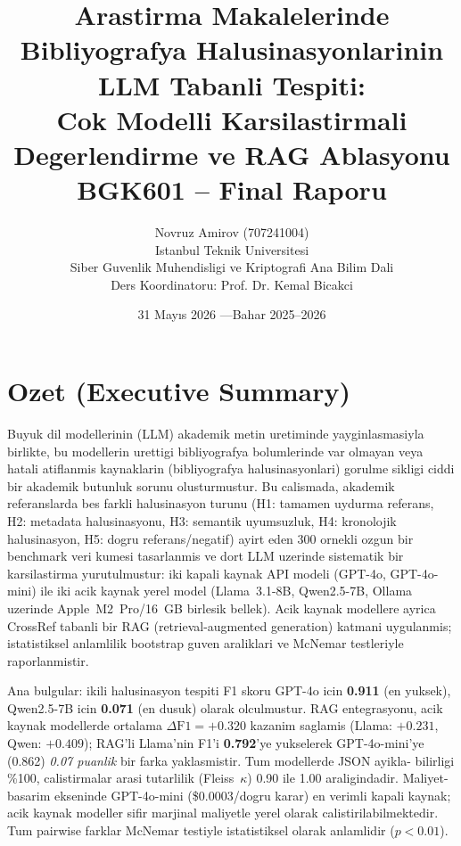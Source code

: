 \documentclass[11pt,a4paper]{article}
\title{\textbf{Arastirma Makalelerinde Bibliyografya
       Halusinasyonlarinin LLM Tabanli Tespiti:\\
       Cok Modelli Karsilastirmali Degerlendirme ve RAG Ablasyonu}\\[0.6em]
       \large BGK601 -- Final Raporu}
\author{Novruz Amirov (707241004)\\
        Istanbul Teknik Universitesi\\
        Siber Guvenlik Muhendisligi ve Kriptografi Ana Bilim Dali\\
        Ders Koordinatoru: Prof. Dr. Kemal Bicakci}
\date{31 Mayıs 2026 \quad ---\quad Bahar 2025--2026}
\begin{document}
\maketitle
\thispagestyle{empty}

\begin{center}\small
{}
\end{center}

\section*{Ozet (Executive Summary)}
Buyuk dil modellerinin (LLM) akademik metin uretiminde yayginlasmasiyla
birlikte, bu modellerin urettigi bibliyografya bolumlerinde var olmayan veya
hatali atiflanmis kaynaklarin (bibliyografya halusinasyonlari) gorulme sikligi
ciddi bir akademik butunluk sorunu olusturmustur. Bu calismada, akademik
referanslarda bes farkli halusinasyon turunu (H1: tamamen uydurma referans,
H2: metadata halusinasyonu, H3: semantik uyumsuzluk, H4: kronolojik
halusinasyon, H5: dogru referans/negatif) ayirt eden 300 ornekli ozgun bir
benchmark veri kumesi tasarlanmis ve dort LLM uzerinde sistematik bir
karsilastirma yurutulmustur: iki kapali kaynak API modeli (GPT-4o,
GPT-4o-mini) ile iki acik kaynak yerel model (Llama~3.1-8B, Qwen2.5-7B,
Ollama uzerinde Apple~M2~Pro/16~GB birlesik bellek). Acik kaynak modellere
ayrica CrossRef tabanli bir RAG (retrieval-augmented generation) katmani
uygulanmis; istatistiksel anlamlilik bootstrap guven araliklari ve McNemar
testleriyle raporlanmistir.

Ana bulgular: ikili halusinasyon tespiti F1 skoru GPT-4o icin
\textbf{0.911} (en yuksek), Qwen2.5-7B icin \textbf{0.071} (en dusuk) olarak
olculmustur. RAG entegrasyonu, acik kaynak modellerde ortalama
$\Delta\text{F1}=+0.320$ kazanim saglamis (Llama: $+0.231$, Qwen: $+0.409$);
RAG'li Llama'nin F1'i \textbf{0.792}'ye yukselerek GPT-4o-mini'ye (0.862)
\emph{0.07 puanlik} bir farka yaklasmistir. Tum modellerde JSON ayikla-
bilirligi \%100, calistirmalar arasi tutarlilik (Fleiss~$\kappa$) 0.90 ile
1.00 araligindadir. Maliyet-basarim ekseninde GPT-4o-mini
(\$0.0003/dogru karar) en verimli kapali kaynak; acik kaynak modeller sifir
marjinal maliyetle yerel olarak calistirilabilmektedir. Tum pairwise farklar
McNemar testiyle istatistiksel olarak anlamlidir ($p < 0.01$).
\end{document}
